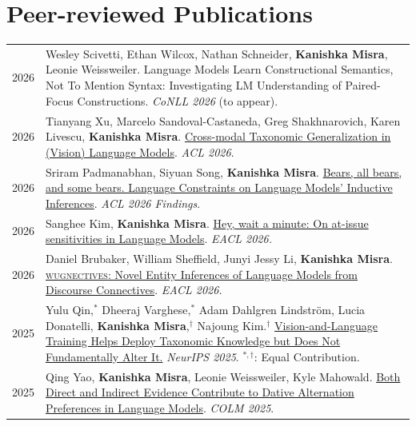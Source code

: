 \documentclass[11pt]{article}
\begin{document}
\section*{Peer-reviewed Publications}
\vspace{-1.5em}
\renewcommand*{\arraystretch}{1.5}
\begin{longtable}{p{}  p{} }

2026 & Wesley Scivetti, Ethan Wilcox, Nathan Schneider, \textbf{Kanishka Misra}, Leonie Weissweiler. Language Models Learn Constructional Semantics, Not To Mention Syntax: Investigating LM Understanding of Paired-Focus Constructions. \textit{CoNLL 2026} (to appear).\\

2026 & Tianyang Xu, Marcelo Sandoval-Castaneda, Greg Shakhnarovich, Karen Livescu, \textbf{Kanishka Misra}. \href{https://arxiv.org/abs/2603.07474}{Cross-modal Taxonomic Generalization in (Vision) Language Models}. \textit{ACL 2026}.\\

2026 & Sriram Padmanabhan, Siyuan Song, \textbf{Kanishka Misra}. \href{https://arxiv.org/abs/2601.09852}{Bears, all bears, and some bears. Language Constraints on Language Models' Inductive Inferences}. \textit{ACL 2026 Findings}.\\

2026 & Sanghee Kim, \textbf{Kanishka Misra}. \href{https://arxiv.org/abs/2510.12740}{Hey, wait a minute: On at-issue sensitivities in Language Models}. \textit{EACL 2026.}\\

2026 & Daniel Brubaker, William Sheffield, Junyi Jessy Li, \textbf{Kanishka Misra}. \href{https://arxiv.org/abs/2510.09556}{\textsc{wugnectives}: Novel Entity Inferences of Language Models from Discourse Connectives}. \textit{EACL 2026.}\\

2025 & Yulu Qin,$^*$ Dheeraj Varghese,$^*$ Adam Dahlgren Lindström, Lucia Donatelli, \textbf{Kanishka Misra},$^\dagger$ Najoung Kim.$^\dagger$ \href{https://arxiv.org/abs/2507.13328}{Vision-and-Language Training Helps Deploy Taxonomic Knowledge but Does Not Fundamentally Alter It.} \textit{NeurIPS 2025}. $^{*,\dagger}$: Equal Contribution.\\

2025 & Qing Yao, \textbf{Kanishka Misra}, Leonie Weissweiler, Kyle Mahowald. \href{https://arxiv.org/abs/2503.20850}{Both Direct and Indirect Evidence Contribute to Dative Alternation Preferences in Language Models}. \textit{COLM 2025}.\\


\end{longtable}
\end{document}
